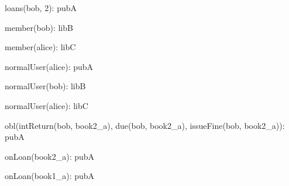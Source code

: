 \documentclass{article}
\begin{document}
{\begin{minipage}{\tableWidth}
\begin{description}[align=left,leftmargin=1em,noitemsep,labelsep=\parindent]
\item{{loans(\allowbreak{}bob, 2): pubA}}
\item{{member(\allowbreak{}bob): libB}}
\item{{member(\allowbreak{}alice): libC}}
\item{{normalUser(\allowbreak{}alice): pubA}}
\item{{normalUser(\allowbreak{}bob): libB}}
\item{{normalUser(\allowbreak{}alice): libC}}
\item{{obl(\allowbreak{}intReturn(\allowbreak{}bob, book2\_a), due(\allowbreak{}bob, book2\_a), issueFine(\allowbreak{}bob, book2\_a)): pubA}}
\item{{onLoan(\allowbreak{}book2\_a): pubA}}
\item{{onLoan(\allowbreak{}book1\_a): pubA}}
\end{description}\end{minipage}}
\end{document}

